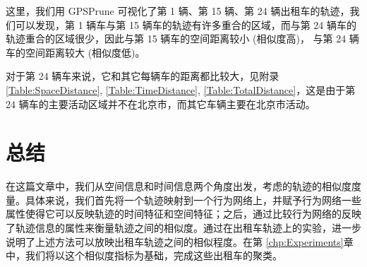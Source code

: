 \vspace{2mm}



\vspace{2mm}
这里，我们用 GPSPrune 可视化了第 1 辆、第 15 辆、第 24 辆出租车的轨迹，我们可以发现，第 1 辆车与第 15 辆车的轨迹有许多重合的区域，而与第 24 辆车的轨迹重合的区域很少，因此与第 15 辆车的空间距离较小 (相似度高)， 与第 24 辆车的空间距离较大 (相似度低)。\par
对于第 24 辆车来说，它和其它每辆车的距离都比较大，见附录 \ref{Table:SpaceDistance}, \ref{Table:TimeDistance}, \ref{Table:TotalDistance}，这是由于第 24 辆车的主要活动区域并不在北京市，而其它车辆主要在北京市活动。

\section{总结}
\label{simlarity:conclusion}
在这篇文章中，我们从空间信息和时间信息两个角度出发，考虑的轨迹的相似度度量。具体来说，我们首先将一个轨迹映射到一个行为网络上，并赋予行为网络一些属性使得它可以反映轨迹的时间特征和空间特征；之后，通过比较行为网络的反映了轨迹信息的属性来衡量轨迹之间的相似度。通过在出租车轨迹上的实验，进一步说明了上述方法可以放映出租车轨迹之间的相似程度。在第 \ref{chp:Experiments}章中，我们将以这个相似度指标为基础，完成这些出租车的聚类。








